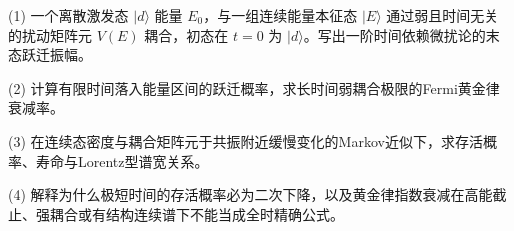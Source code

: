 (1) 一个离散激发态 \(|d\rangle\) 能量 \(E_0\)，与一组连续能量本征态 \(|E\rangle\) 通过弱且时间无关的扰动矩阵元 \(V(E)\) 耦合，初态在 \(t=0\) 为 \(|d\rangle\)。写出一阶时间依赖微扰论的末态跃迁振幅。

(2) 计算有限时间落入能量区间的跃迁概率，求长时间弱耦合极限的Fermi黄金律衰减率。

(3) 在连续态密度与耦合矩阵元于共振附近缓慢变化的Markov近似下，求存活概率、寿命与Lorentz型谱宽关系。

(4) 解释为什么极短时间的存活概率必为二次下降，以及黄金律指数衰减在高能截止、强耦合或有结构连续谱下不能当成全时精确公式。
